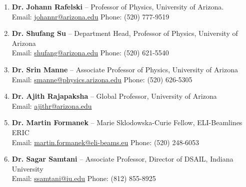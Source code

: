 \documentclass[11pt]{article}
\begin{document}
{\normalsize
\begin{enumerate}[leftmargin=*,nosep]
    \item \textbf{Dr. Johann Rafelski} -- Professor of Physics, University of Arizona.\\
    Email: \href{mailto:johannr@arizona.edu}{johannr@arizona.edu} \quad Phone: (520) 777-9519
    \item \textbf{Dr. Shufang Su} -- Department Head, Professor of Physics, University of Arizona\\
    Email: \href{mailto:shufang@arizona.edu}{shufang@arizona.edu} \quad Phone: (520) 621-5540
    \item \textbf{Dr. Srin Manne} -- Associate Professor of Physics, University of Arizona\\
    Email: \href{mailto:smanne@physics.arizona.edu}{smanne@physics.arizona.edu} \quad Phone: (520) 626-5305
    \item \textbf{Dr. Ajith Rajapaksha} -- Global Professor, University of Arizona\\
    Email: \href{mailto:ajithr@arizona.edu}{ajithr@arizona.edu}
    \item \textbf{Dr. Martin Formanek} -- Marie Sklodowska-Curie Fellow, ELI-Beamlines ERIC\\
    Email: \href{mailto:martin.formanek@eli-beams.eu}{martin.formanek@eli-beams.eu} \quad Phone: (520) 248-6053
    \item \textbf{Dr. Sagar Samtani} -- Associate Professor, Director of DSAIL, Indiana University\\
    Email: \href{mailto:ssamtani@iu.edu}{ssamtani@iu.edu} \quad Phone: (812) 855-8925
\end{enumerate}
}
\end{document}
